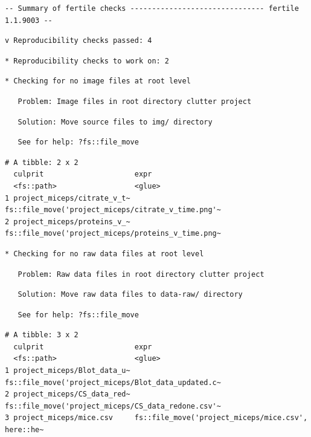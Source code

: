 \documentclass[12pt,twoside]{reedthesis}
\begin{document}
\begin{verbatim}
-- Summary of fertile checks ------------------------------- fertile 1.1.9003 --
\end{verbatim}
\begin{verbatim}
v Reproducibility checks passed: 4
\end{verbatim}
\begin{verbatim}
* Reproducibility checks to work on: 2
\end{verbatim}
\begin{verbatim}
* Checking for no image files at root level
\end{verbatim}
\begin{verbatim}
   Problem: Image files in root directory clutter project
\end{verbatim}
\begin{verbatim}
   Solution: Move source files to img/ directory
\end{verbatim}
\begin{verbatim}
   See for help: ?fs::file_move
\end{verbatim}
\begin{verbatim}
# A tibble: 2 x 2
  culprit                     expr                                              
  <fs::path>                  <glue>                                            
1 project_miceps/citrate_v_t~ fs::file_move('project_miceps/citrate_v_time.png'~
2 project_miceps/proteins_v_~ fs::file_move('project_miceps/proteins_v_time.png~
\end{verbatim}
\begin{verbatim}
* Checking for no raw data files at root level
\end{verbatim}
\begin{verbatim}
   Problem: Raw data files in root directory clutter project
\end{verbatim}
\begin{verbatim}
   Solution: Move raw data files to data-raw/ directory
\end{verbatim}
\begin{verbatim}
   See for help: ?fs::file_move
\end{verbatim}
\begin{verbatim}
# A tibble: 3 x 2
  culprit                     expr                                              
  <fs::path>                  <glue>                                            
1 project_miceps/Blot_data_u~ fs::file_move('project_miceps/Blot_data_updated.c~
2 project_miceps/CS_data_red~ fs::file_move('project_miceps/CS_data_redone.csv'~
3 project_miceps/mice.csv     fs::file_move('project_miceps/mice.csv', here::he~
\end{verbatim}
\normalsize
\end{document}
